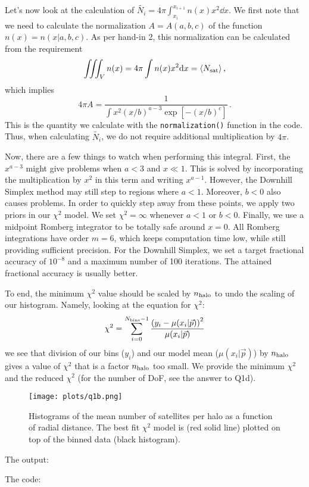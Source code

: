Let's now look at the calculation of $\tilde{N_{i}} = 4 \pi \int_{x_{i}}^{x_{i+1}} n(x) x^{2} \dd x$. We first note that we need to calculate the
normalization $A = A(a,b,c)$ of the function $n(x) = n(x|a,b,c)$. As per hand-in 2, this normalization can be calculated from the requirement
\begin{equation}
    \iiint_{V} n(x) = 4 \pi \int n(x) x^{2} \mathrm{d} x = \langle N_{\rm sat} \rangle \, ,
\end{equation}
which implies
\begin{equation}
    4 \pi A = \frac{1}{\int x^2 (x/b)^{a-3} \exp \left[- (x/b)^{c} \right]} \, .
\end{equation}
This is the quantity we calculate with the \texttt{normalization()} function in the code. Thus, when calculating $\tilde{N_{i}}$, we do not
require additional multiplication by $4 \pi$.

Now, there are a few things to watch when performing this integral. First, the $x^{a - 3}$ might give problems when $a < 3$ and $x \ll 1$. 
This is solved by incorporating the multiplication by $x^2$ in this term and writing $x^{a - 1}$. However, the Downhill Simplex method may
still step to regions where $a < 1$. Moreover, $b < 0$ also causes problems. In order to quickly step away from these points, we apply two priors in our $\chi^2$ 
model. We set $\chi^2 = \infty$ whenever $a < 1$ or $b < 0$. Finally, we use a midpoint Romberg integrator to be totally safe around $x = 0$.
All Romberg integrations have order $m = 6$, which keeps computation time low, while still providing sufficient precision.
For the Downhill Simplex, we set a target fractional accuracy of $10^{-8}$ and a maximum number of 100 iterations. 
The attained fractional accuracy is usually better.

To end, the minimum $\chi^2$ value should be scaled by $n_{\rm halo}$ to undo the scaling of our histogram. Namely, looking at the equation
for $\chi^2$:
\begin{equation}
    \chi^2 = \sum_{i = 0}^{N_{\rm bins} - 1} \frac{\left(y_{i} - \mu(x_{i} | \vec{p}) \right)^{2}}{\mu(x_{i} | \vec{p})}
\end{equation}
we see that division of our bins ($y_{i}$) and our model mean ($\mu(x_{i} | \vec{p})$) by $n_{\rm halo}$ gives a value of $\chi^2$ that is 
a factor $n_{\rm halo}$ too small. We provide the minimum $\chi^2$ and the reduced $\chi^2$ (for the number of DoF, see the answer to Q1d).

\begin{figure}[H]
    \centering
    \texttt{[image: plots/q1b.png]}
    \caption{Histograms of the mean number of satellites per halo as a function of radial distance. The best fit $\chi^{2}$ model is
    (red solid line) plotted on top of the binned data (black histogram).
    }
\end{figure}

\noindent The output:



\noindent The code:

